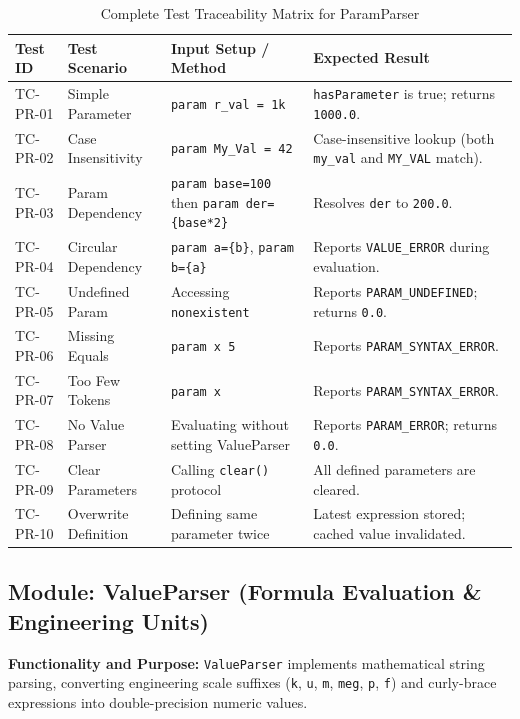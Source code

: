 \begin{table}[H]
\centering
\small
\begin{tabular}{|l|l|p{4.5cm}|p{4.5cm}|}
\hline
\textbf{Test ID} & \textbf{Test Scenario} & \textbf{Input Setup / Method} & \textbf{Expected Result} \\
\hline
TC-PR-01 & Simple Parameter & \texttt{param r\_val = 1k} & \texttt{hasParameter} is true; returns \texttt{1000.0}. \\
\hline
TC-PR-02 & Case Insensitivity & \texttt{param My\_Val = 42} & Case-insensitive lookup (both \texttt{my\_val} and \texttt{MY\_VAL} match). \\
\hline
TC-PR-03 & Param Dependency & \texttt{param base=100} then \texttt{param der=\{base*2\}} & Resolves \texttt{der} to \texttt{200.0}. \\
\hline
TC-PR-04 & Circular Dependency & \texttt{param a=\{b\}}, \texttt{param b=\{a\}} & Reports \texttt{VALUE\_ERROR} during evaluation. \\
\hline
TC-PR-05 & Undefined Param & Accessing \texttt{nonexistent} & Reports \texttt{PARAM\_UNDEFINED}; returns \texttt{0.0}. \\
\hline
TC-PR-06 & Missing Equals & \texttt{param x 5} & Reports \texttt{PARAM\_SYNTAX\_ERROR}. \\
\hline
TC-PR-07 & Too Few Tokens & \texttt{param x} & Reports \texttt{PARAM\_SYNTAX\_ERROR}. \\
\hline
TC-PR-08 & No Value Parser & Evaluating without setting ValueParser & Reports \texttt{PARAM\_ERROR}; returns \texttt{0.0}. \\
\hline
TC-PR-09 & Clear Parameters & Calling \texttt{clear()} protocol & All defined parameters are cleared. \\
\hline
TC-PR-10 & Overwrite Definition & Defining same parameter twice & Latest expression stored; cached value invalidated. \\
\hline
\end{tabular}
\caption{Complete Test Traceability Matrix for ParamParser}
\end{table}


\subsection{Module: ValueParser (Formula Evaluation \& Engineering Units)}

\textbf{Functionality and Purpose:} \texttt{ValueParser} implements mathematical string parsing, converting engineering scale suffixes (\texttt{k}, \texttt{u}, \texttt{m}, \texttt{meg}, \texttt{p}, \texttt{f}) and curly-brace expressions into double-precision numeric values.

